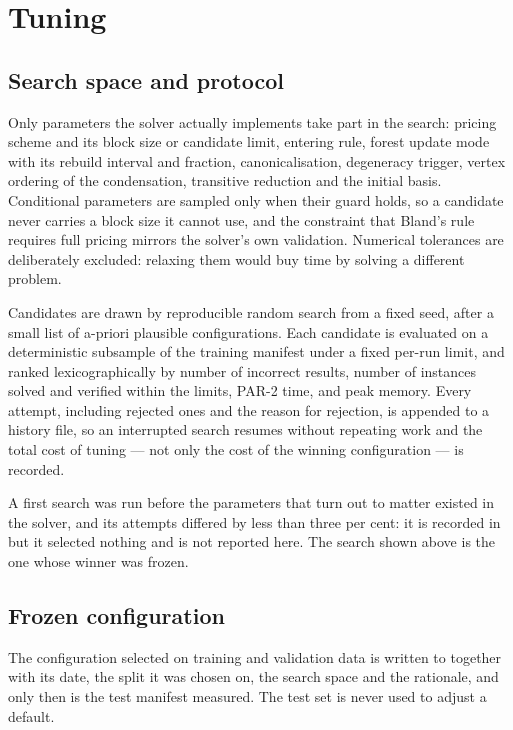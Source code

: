 \section{Tuning}
\label{sec:tuning}

\subsection{Search space and protocol}

Only parameters the solver actually implements take part in the search:
pricing scheme and its block size or candidate limit, entering rule, forest
update mode with its rebuild interval and fraction, canonicalisation,
degeneracy trigger, vertex ordering of the condensation, transitive reduction and
the initial basis. Conditional parameters are sampled only when their guard
holds, so a candidate never carries a block size it cannot use, and the
constraint that Bland's rule requires full pricing mirrors the solver's own
validation. Numerical tolerances are deliberately excluded: relaxing them would
buy time by solving a different problem.

Candidates are drawn by reproducible random search from a fixed seed, after a
small list of a-priori plausible configurations. Each candidate is evaluated on
a deterministic subsample of the training manifest under a fixed per-run limit,
and ranked lexicographically by number of incorrect results, number of instances
solved and verified within the limits, PAR-2 time, and peak memory. Every
attempt, including rejected ones and the reason for rejection, is appended to a
history file, so an interrupted search resumes without repeating work and the
total cost of tuning --- not only the cost of the winning configuration --- is
recorded.


A first search was run before the parameters that turn out to matter existed in
the solver, and its attempts differed by less than three per cent: it is recorded
in  but it selected nothing and is not reported here.
The search shown above is the one whose winner was frozen.

\subsection{Frozen configuration}

The configuration selected on training and validation data is written to
 together with its date, the split it was chosen on, the
search space and the rationale, and only then is the test manifest measured. The
test set is never used to adjust a default.
